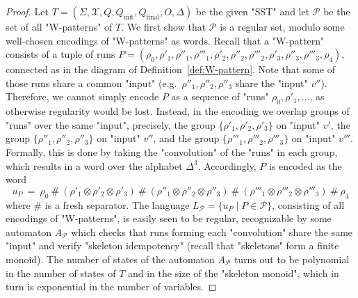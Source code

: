 \documentclass{theoretics}
\newcommand{\var}{\mathcal{X}}
\newcommand{\alp}{\Sigma}
\newcommand{\finalupd}{O}
\begin{document}
\begin{proof}
    Let $T = (\alp, \var, Q, Q_{\mathrm{init}}, Q_{\mathrm{final}}, \finalupd, \Delta)$ 
    be the given "SST" and 
    let $\mathcal{P}$ be the set of all "W-patterns" of $T$.
    We first show that $\mathcal{P}$ is a regular set, modulo some 
    well-chosen encodings of "W-patterns" as words. 
    Recall that a "W-pattern" consists of a tuple of runs
    $P = (\rho_0,
          \rho'_1,\rho''_1,\rho'''_1,
          \rho'_2,\rho''_2,\rho'''_2,
          \rho'_3,\rho''_3,\rho'''_3,
          \rho_4)$,
    connected as in the diagram of
    Definition~\ref{def:W-pattern}. 
    Note that some of those runs share a common "input" 
    (e.g.~$\rho''_1,\rho''_2,\rho''_3$ share the "input" $v''$). 
    Therefore, we cannot simply encode $P$ as a sequence 
    of "runs" $\rho_0,\rho'_1,\dots$, as otherwise regularity 
    would be lost. 
    Instead, in the encoding we overlap groups of "runs" 
    over the same "input", precisely, 
    the group $\{\rho'_1,\rho'_2,\rho'_3\}$ on "input" $v'$,
    the group $\{\rho''_1,\rho''_2,\rho''_3\}$ on "input" $v''$,
    and the group $\{\rho'''_1,\rho'''_2,\rho'''_3\}$ on "input" $v'''$.
	Formally, this is done by taking the "convolution"
	of the "runs" in each group, which results
    in a word over the alphabet $\Delta^3$. 
    Accordingly, $P$ is encoded as the word
    \[
      u_P ~=~ 
      \rho_0 \:\#\: 
      (\rho'_1 \otimes \rho'_2 \otimes \rho'_3) \:\#\:
      (\rho''_1 \otimes \rho''_2 \otimes \rho''_3) \:\#\:
      (\rho'''_1 \otimes \rho'''_2 \otimes \rho'''_3) \:\#\:
      \rho_4
    \]
	where $\#$ is a fresh separator. 
	The language $L_{\mathcal{P}} = \{ u_P \mid P\in\mathcal{P}\}$, 
	consisting of all encodings of "W-patterns", is easily seen to
        be regular, recognizable by some automaton $A_{\mathcal{P}}$
        which checks that runs forming each "convolution" share the
        same "input" and verify "skeleton idempotency" 
        (recall that "skeletons" form a finite monoid). 
	The number of states of the automaton $A_{\mathcal{P}}$ 
	turns out to be polynomial in the number of states of $T$
	and in the size of the "skeleton monoid", which
	in turn is exponential in the number of variables. 
    

\end{proof}
\end{document}
